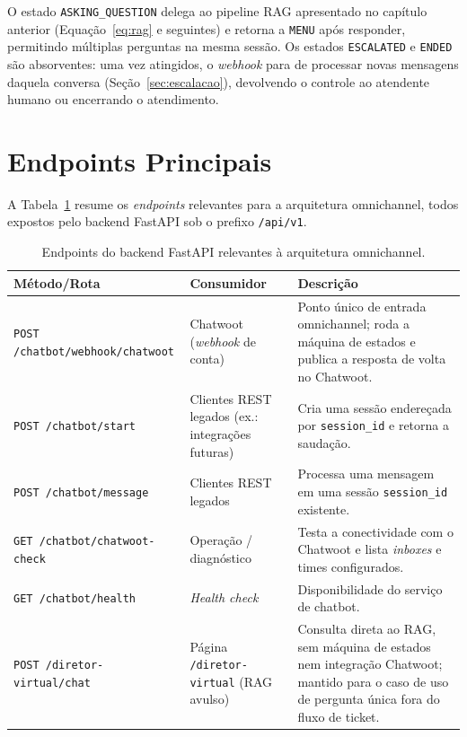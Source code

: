 \documentclass[12pt,a4paper]{report}
\begin{document}
O estado \texttt{ASKING\_QUESTION} delega ao pipeline RAG apresentado no
capítulo anterior (Equação~\eqref{eq:rag} e seguintes) e retorna a
\texttt{MENU} após responder, permitindo múltiplas perguntas na mesma
sessão. Os estados \texttt{ESCALATED} e \texttt{ENDED} são absorventes: uma
vez atingidos, o \textit{webhook} para de processar novas mensagens daquela
conversa (Seção~\ref{sec:escalacao}), devolvendo o controle ao atendente
humano ou encerrando o atendimento.

\section{Endpoints Principais}

A Tabela~\ref{tab:endpoints} resume os \textit{endpoints} relevantes para a
arquitetura omnichannel, todos expostos pelo backend FastAPI sob o prefixo
\texttt{/api/v1}.

\begin{table}[H]
\centering
\small
\begin{tabularx}{\textwidth}{lp{4.3cm}X}
\toprule
\textbf{Método/Rota} & \textbf{Consumidor} & \textbf{Descrição} \\
\midrule
\texttt{POST /chatbot/webhook/chatwoot} & Chatwoot (\textit{webhook} de conta) &
  Ponto único de entrada omnichannel; roda a máquina de estados e publica a
  resposta de volta no Chatwoot. \\
\texttt{POST /chatbot/start} & Clientes REST legados (ex.: integrações
  futuras) &
  Cria uma sessão endereçada por \texttt{session\_id} e retorna a saudação. \\
\texttt{POST /chatbot/message} & Clientes REST legados &
  Processa uma mensagem em uma sessão \texttt{session\_id} existente. \\
\texttt{GET /chatbot/chatwoot-check} & Operação / diagnóstico &
  Testa a conectividade com o Chatwoot e lista \textit{inboxes} e times
  configurados. \\
\texttt{GET /chatbot/health} & \textit{Health check} &
  Disponibilidade do serviço de chatbot. \\
\texttt{POST /diretor-virtual/chat} & Página \texttt{/diretor-virtual} (RAG avulso) &
  Consulta direta ao RAG, sem máquina de estados nem integração Chatwoot;
  mantido para o caso de uso de pergunta única fora do fluxo de ticket. \\
\bottomrule
\end{tabularx}
\caption{Endpoints do backend FastAPI relevantes à arquitetura omnichannel.}
\label{tab:endpoints}
\end{table}
\end{document}
